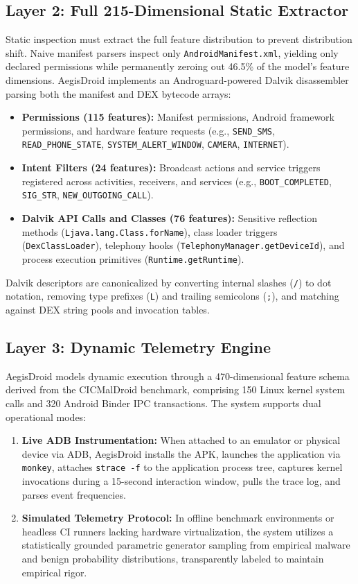 \documentclass[10pt,journal,compsoc]{IEEEtran}
\begin{document}
\subsection{Layer 2: Full 215-Dimensional Static Extractor}
Static inspection must extract the full feature distribution to prevent distribution shift. Naive manifest parsers inspect only \texttt{AndroidManifest.xml}, yielding only declared permissions while permanently zeroing out 46.5\% of the model's feature dimensions. AegisDroid implements an Androguard-powered Dalvik disassembler parsing both the manifest and DEX bytecode arrays:
\begin{itemize}
    \item \textbf{Permissions (115 features):} Manifest permissions, Android framework permissions, and hardware feature requests (e.g., \texttt{SEND\_SMS}, \texttt{READ\_PHONE\_STATE}, \texttt{SYSTEM\_ALERT\_WINDOW}, \texttt{CAMERA}, \texttt{INTERNET}).
    \item \textbf{Intent Filters (24 features):} Broadcast actions and service triggers registered across activities, receivers, and services (e.g., \texttt{BOOT\_COMPLETED}, \texttt{SIG\_STR}, \texttt{NEW\_OUTGOING\_CALL}).
    \item \textbf{Dalvik API Calls and Classes (76 features):} Sensitive reflection methods (\texttt{Ljava.lang.Class.forName}), class loader triggers (\texttt{DexClassLoader}), telephony hooks (\texttt{TelephonyManager.getDeviceId}), and process execution primitives (\texttt{Runtime.getRuntime}).
\end{itemize}
Dalvik descriptors are canonicalized by converting internal slashes (\texttt{/}) to dot notation, removing type prefixes (\texttt{L}) and trailing semicolons (\texttt{;}), and matching against DEX string pools and invocation tables.

\subsection{Layer 3: Dynamic Telemetry Engine}
AegisDroid models dynamic execution through a 470-dimensional feature schema derived from the CICMalDroid benchmark, comprising 150 Linux kernel system calls and 320 Android Binder IPC transactions. The system supports dual operational modes:
\begin{enumerate}
    \item \textbf{Live ADB Instrumentation:} When attached to an emulator or physical device via ADB, AegisDroid installs the APK, launches the application via \texttt{monkey}, attaches \texttt{strace -f} to the application process tree, captures kernel invocations during a 15-second interaction window, pulls the trace log, and parses event frequencies.
    \item \textbf{Simulated Telemetry Protocol:} In offline benchmark environments or headless CI runners lacking hardware virtualization, the system utilizes a statistically grounded parametric generator sampling from empirical malware and benign probability distributions, transparently labeled to maintain empirical rigor.
\end{enumerate}
\end{document}
